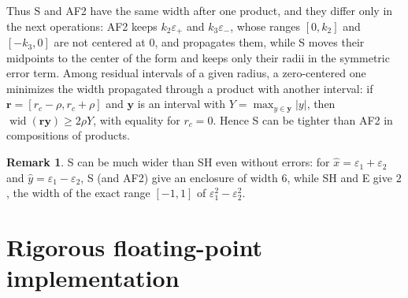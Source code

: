 \documentclass[10pt]{article}
\theoremstyle{definition}
\newtheorem{remark}{Remark}
\newcommand{\eps}{\varepsilon}
\newcommand{\wid}{\operatorname{wid}}
\begin{document}
Thus S and AF2 have the same width after one product, and they differ only in the next operations: AF2 keeps $k_2\eps_+$ and $k_3\eps_-$, whose ranges $[0,k_2]$ and $[-k_3,0]$ are not centered at $0$, and propagates them, while S moves their midpoints to the center of the form and keeps only their radii in the symmetric error term. Among residual intervals of a given radius, a zero-centered one minimizes the width propagated through a product with another interval: if $\mathbf r=[r_c-\rho,r_c+\rho]$ and $\mathbf y$ is an interval with $Y=\max_{y\in\mathbf y}|y|$, then $\wid(\mathbf r\mathbf y)\ge 2\rho Y$, with equality for $r_c=0$. Hence S can be tighter than AF2 in compositions of products.

\begin{remark}
S can be much wider than SH even without errors: for $\hat x=\eps_1+\eps_2$ and $\hat y=\eps_1-\eps_2$, S (and AF2) give an enclosure of width $6$, while SH and E give $2$, the width of the exact range $[-1,1]$ of $\eps_1^2-\eps_2^2$.
\end{remark}

\section{Rigorous floating-point implementation}
\label{sec:rigor}
\end{document}
